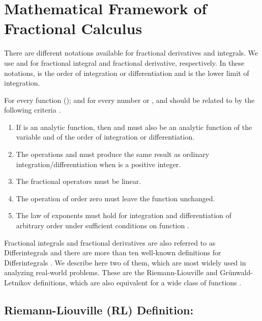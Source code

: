 \documentclass {llncs}
\begin{document}
\section{Mathematical Framework of  Fractional Calculus} \label{sec:fractional_calculus}
 There are different notations available for fractional derivatives and integrals.
 We use  and  for fractional integral and fractional derivative, respectively.
  In these notations,  is the order of integration or differentiation and  is the lower limit of integration.

 For every function (); and for every number  or ,  and  should be related to  by the following criteria \cite{Das:2007:FFC:1564573}.


\begin{enumerate}
\item If  is an analytic function, then  and  must also be an analytic function of the variable  and of the order  of integration or differentiation.
\item The operations   and  must produce the same result as ordinary integration/differentiation when  is a positive integer.
\item The fractional operators must be linear.




	\item The operation of order zero must leave the function unchanged.

 	\item The law of exponents must hold for integration and differentiation  of arbitrary order under sufficient conditions on function .
 
   \end{enumerate}

\noindent Fractional integrals and fractional derivatives are also referred to as  Differintegrals \cite{B1_74} and  there are more than ten
well-known definitions for Differintegrals \cite{APP_10}. We describe here two of them,  which are  most widely used in analyzing real-world problems. These are the Riemann-Liouville and Gr\"{u}nwald-Letnikov definitions, which are also equivalent for a wide class of functions \cite{c_2}.


 \subsection*{\textbf{Riemann-Liouville (RL) Definition:}}
\end{document}
